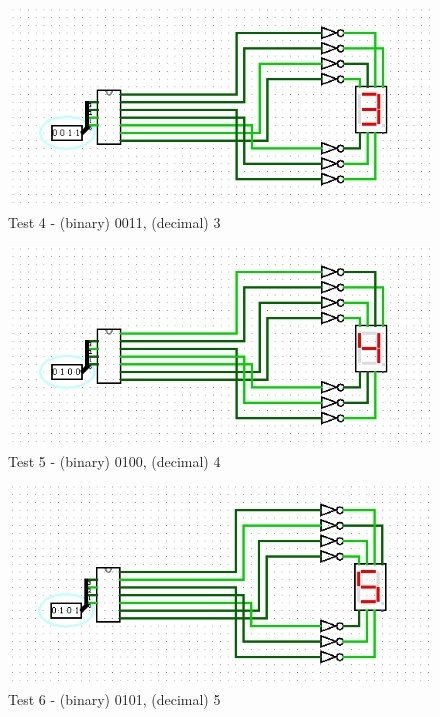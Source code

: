 \begin{figure}[h]
    \centering
    \includegraphics[width=\linewidth]{ScreenshotsTests/Comp 1/Comp 1_00006.png}
    \caption{Test 4 - (binary) 0011, (decimal) 3}
    \label{fig:test3}
\end{figure}

\begin{figure}[h]
    \centering
    \includegraphics[width=\linewidth]{ScreenshotsTests/Comp 1/Comp 1_00005.png}
    \caption{Test 5 - (binary) 0100, (decimal) 4}
    \label{fig:test4}
\end{figure}

\begin{figure}[h]
    \centering
    \includegraphics[width=\linewidth]{ScreenshotsTests/Comp 1/Comp 1_00004.png}
    \caption{Test 6 - (binary) 0101, (decimal) 5}
    \label{fig:test5}
\end{figure}

